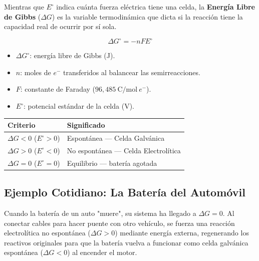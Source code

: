 \documentclass[letterpaper, 12pt, twoside]{article}
\newenvironment{formulabox}[1]{%
    \begin{tcolorbox}[colback=rojoSuave, colframe=rojoFuerte,
        title=\textbf{#1}, fonttitle=\bfseries]
}{%
    \end{tcolorbox}
}
\begin{document}
Mientras que $E^\circ$ indica cuánta fuerza eléctrica tiene una celda, la \textbf{Energía Libre de Gibbs} ($\Delta G$) es la variable termodinámica que dicta si la reacción tiene la capacidad real de ocurrir por sí sola.

\begin{formulabox}{Energía Libre de Gibbs y Espontaneidad}
    \[ \Delta G^\circ = -nFE^\circ \]
    \begin{itemize}[leftmargin=15pt, topsep=2pt, itemsep=0pt]
        \item $\Delta G^\circ$: energía libre de Gibbs (J). \vspace{0.2cm}
        \item $n$: moles de $e^-$ transferidos al balancear las semirreacciones. \vspace{0.2cm}
        \item $F$: constante de Faraday ($96{,}485\ \text{C/mol}\ e^-$).\vspace{0.2cm}
        \item $E^\circ$: potencial estándar de la celda (V).
    \end{itemize}
    \vspace{0.2cm}
    \begin{center}
    \renewcommand{\arraystretch}{1.3}
    \begin{tabular}{ll}
        \toprule
        \textbf{Criterio} & \textbf{Significado} \\
        \midrule
        $\Delta G < 0$ \quad ($E^\circ > 0$) & Espontánea — Celda Galvánica \\
        $\Delta G > 0$ \quad ($E^\circ < 0$) & No espontánea — Celda Electrolítica \\
        $\Delta G = 0$ \quad ($E^\circ = 0$) & Equilibrio — batería agotada \\
        \bottomrule
    \end{tabular}
    \end{center}
\end{formulabox}

\subsection*{Ejemplo Cotidiano: La Batería del Automóvil}
Cuando la batería de un auto "muere", su sistema ha llegado a $\Delta G = 0$. Al conectar cables para hacer puente con otro vehículo, se fuerza una reacción electrolítica no espontánea ($\Delta G > 0$) mediante energía externa, regenerando los reactivos originales para que la batería vuelva a funcionar como celda galvánica espontánea ($\Delta G < 0$) al encender el motor.
\newpage
\end{document}
